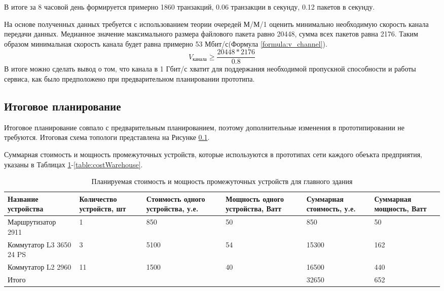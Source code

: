 \documentclass[14pt, a4paper]{extarticle}
\numberwithin{equation}{section}
\begin{document}
В итоге за 8 часовой день формируется примерно 1860 транзакций,
0.06 транзакции в секунду, 0.12 пакетов в секунду.


На основе полученных данных требуется с использованием теории очередей М/М/1 \cite{calc} оценить минимально необходимую скорость канала передачи данных.
Медианное значение максимального размера файлового пакета равно 20448, сумма всех пакетов равна 2176.
Таким образом минимальная скорость канала будет равна примерно 53 Мбит/с(Формула \ref{formula:v_channel}).
\begin{equation}
        V_\text{канала} \ge \frac{20448 * 2176}{0.8}
        \label{formula:v_channel}
\end{equation}
В итоге можно сделать вывод о том, что канала в 1 Гбит/с хватит для поддержания необходимой пропускной способности и работы сервиса, как было предположено при предварительном планировании прототипа. 

\subsection{Итоговое планирование}
Итоговое планирование совпало с предварительным планированием, поэтому дополнительные изменения
в прототипировании не требуются. Итоговая схема топологи представлена на Рисунке \ref{}.

Суммарная стоимость и мощность промежуточных устройств, которые
используются в прототипах сети каждого обеъкта предприятия, указаны в Таблицах \ref{table:costMainDep}-\ref{table:costWarehouse}.
\begin{table}[H]
\centering
\small
\caption{Планируемая стоимость и мощность промежуточных устройств для главного здания}
\label{table:costMainDep}
\begin{tabular}{|m{2.8cm}|m{2.2cm}|m{2.2cm}|m{2.2cm}|m{2.2cm}|m{2.1cm}|}
\hline
\textbf{Название устройства} & \textbf{Количество устройств, шт} & \textbf{Стоимость одного устройства, у.е.} & \textbf{Мощность одного устройства, Ватт} & \textbf{Суммарная стоимость, у.е.} & \textbf{Суммарная мощность, Ватт}\\
\hline
Маршрутизатор 2911 & 1 & 850 & 50 & 850 & 50 \\ \hline
Коммутатор L3 3650 24 PS& 3 & 5100 & 54 & 15300 & 162 \\ \hline
Коммутатор L2 2960 & 11 & 1500 & 40 & 16500 & 440 \\ \hline
\multicolumn{4}{|l|}{Итого} & 32650 & 652 \\ \hline
\end{tabular}
\end{table} 
\end{document}
